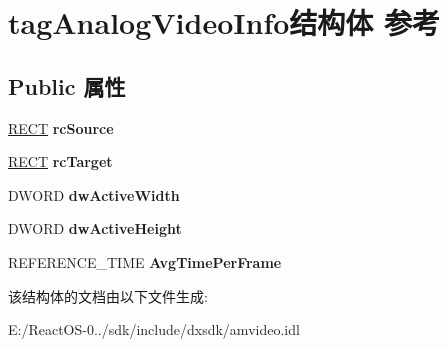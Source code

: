 \hypertarget{structtag_analog_video_info}{}\section{tag\+Analog\+Video\+Info结构体 参考}
\label{structtag_analog_video_info}
\subsection*{Public 属性}
\begin{DoxyCompactItemize}
\item 
\mbox{\label{structtag_analog_video_info_a298ee7dab21f994fdd99fd28b72115e0}} 
\hyperlink{structtag_r_e_c_t}{R\+E\+CT} {\bfseries rc\+Source}
\item 
\mbox{\label{structtag_analog_video_info_abc7fa512922dee0b43f5fa387c744457}} 
\hyperlink{structtag_r_e_c_t}{R\+E\+CT} {\bfseries rc\+Target}
\item 
\mbox{\label{structtag_analog_video_info_ac7b6fa61db133c35d313aeacd805ff6e}} 
D\+W\+O\+RD {\bfseries dw\+Active\+Width}
\item 
\mbox{\label{structtag_analog_video_info_a4da5c2b20aa79d7254f7822e22311e94}} 
D\+W\+O\+RD {\bfseries dw\+Active\+Height}
\item 
\mbox{\label{structtag_analog_video_info_ae6eed551e26b5e88810186d2f6d47be9}} 
R\+E\+F\+E\+R\+E\+N\+C\+E\+\_\+\+T\+I\+ME {\bfseries Avg\+Time\+Per\+Frame}
\end{DoxyCompactItemize}


该结构体的文档由以下文件生成\+:\begin{DoxyCompactItemize}
\item 
E\+:/\+React\+O\+S-\/0../sdk/include/dxsdk/amvideo.\+idl\end{DoxyCompactItemize}
